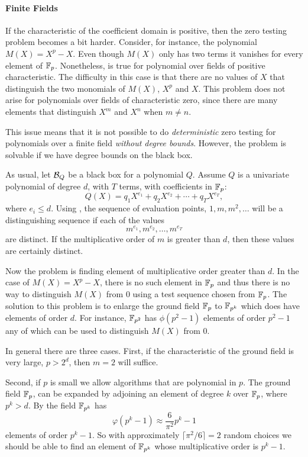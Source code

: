 \paragraph{Finite Fields}

If the characteristic of the coefficient domain is positive, then the
zero testing problem becomes a bit harder.  Consider, for instance,
the polynomial $M(X) = X^p - X$.  Even though $M(X)$ only has two
terms it vanishes for every element of $\mathbb{F}_p$.  Nonetheless,
 is true for polynomial over fields of positive
characteristic.  The difficulty in this case is that there are no
values of $X$ that distinguish the two monomials of $M(X)$, $X^p$ and
$X$.  This problem does not arise for polynomials over fields of
characteristic zero, since there are many elements that distinguish
$X^m$ and $X^n$ when $m \not= n$.

This issue means that it is not possible to do {\em deterministic}
zero testing for polynomials over a finite field {\em without degree
bounds\/}.  However, the problem is solvable if we have degree bounds
on the black box.  

As usual, let ${\cal B}_Q$ be a black box for a polynomial $Q$.
Assume $Q$ is a univariate polynomial of degree $d$, with $T$ terms,
with coefficients in $\mathbb{F}_p$:
\[
Q(X) = q_1 X^{e_1} + q_2 X^{e_2} + \cdots + q_T X^{e_T},
\]
where $e_i \le d$.  Using , the sequence of
evaluation points, $1, m, m^2, \ldots$ will be a distinguishing
sequence if each of the values 
\[
m^{e_1}, m^{e_2}, \ldots, m^{e_T}
\]
are distinct. If the multiplicative order of $m$ is greater than $d$,
then these values are certainly distinct.

Now the problem is finding element of multiplicative order greater
than $d$.  In the case of $M(X) = X^p - X$, there is no such element
in $\mathbb{F}_p$ and thus there is no way to distinguish $M(X)$ from $0$
using a test sequence chosen from $\mathbb{F}_p$.  The solution to this
problem is to enlarge the ground field $\mathbb{F}_p$ to $\mathbb{F}_{p^k}$ which does
have elements of order $d$.  For instance, $\mathbb{F}_{p^2}$ has $\phi(p^2 -1)$
elements of order $p^2 -1$ any of which can be used to distinguish $M(X)$
from $0$.

In general there are three cases.  First, if the characteristic of the
ground field is very large, $p > 2^d$, then $m = 2$ will suffice.

Second, if $p$ is small we allow algorithms that are polynomial in
$p$.  The ground field $\mathbb{F}_p$, can be expanded by adjoining an element
of degree $k$ over $\mathbb{F}_p$, where $p^k > d$.  By
 the field $\mathbb{F}_{p^k}$ has 
\[
\varphi(p^k -1) \approx \frac{6}{\pi^2} p^k -1
\]
elements of order $p^k -1$.  So with approximately $\lceil
\pi^2/6\rceil = 2$ random choices we should be able to find an
element of $\mathbb{F}_{p^k}$ whose multiplicative order is $p^k -1$.

